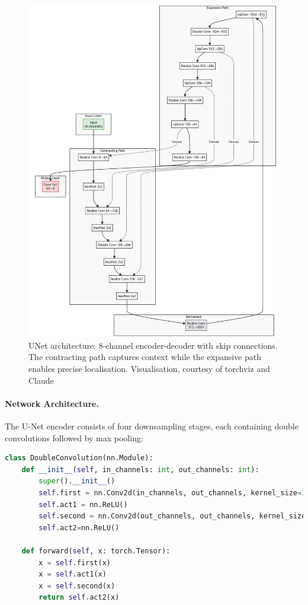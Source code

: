 \begin{figure}
  \centering
  \includegraphics[width=.9\linewidth]{figs/unet-merm.jpg}
  \caption{UNet architecture: 8-channel encoder-decoder with skip connections. The contracting path captures context while the expansive path enables precise localisation. Visualisation, courtesy of torchviz \cite{b16} and Claude \cite{b17}}
  \label{fig:aj_unet_arch}
\end{figure}

\paragraph{Network Architecture.}
The U-Net encoder consists of four downsampling stages, each containing double convolutions followed by max pooling:

\begin{lstlisting}[language=Python]
class DoubleConvolution(nn.Module):
    def __init__(self, in_channels: int, out_channels: int):
        super().__init__()
        self.first = nn.Conv2d(in_channels, out_channels, kernel_size=3, padding=1)
        self.act1 = nn.ReLU()
        self.second = nn.Conv2d(out_channels, out_channels, kernel_size=3, padding=1)
        self.act2=nn.ReLU()

    def forward(self, x: torch.Tensor):
        x = self.first(x)
        x = self.act1(x)
        x = self.second(x)
        return self.act2(x)
\end{lstlisting}

